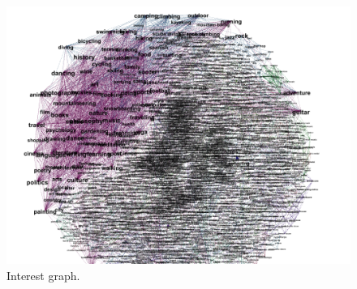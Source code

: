 \begin{figure}[ht]
\centering
\includegraphics[width=1\linewidth]{figures/interest_graph.png}
\caption{Interest graph.}
\label{fig:interest_graph}
\end{figure}
